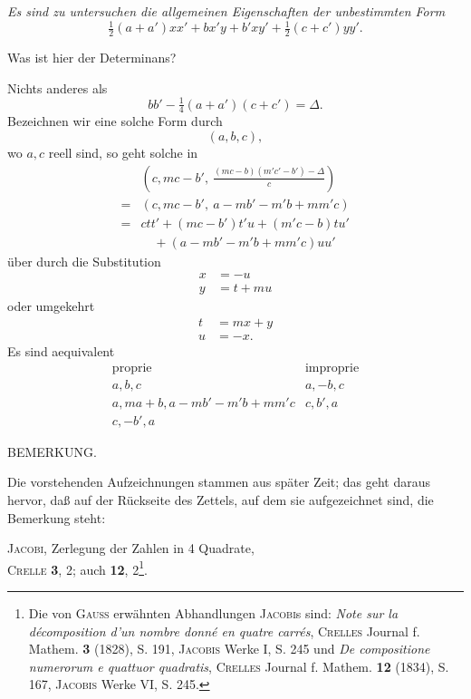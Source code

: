 \textit{Es sind zu untersuchen die allgemeinen Eigenschaften der unbestimmten Form}
\[
\tfrac12(a+a')xx'+bx'y+b'xy'+\tfrac12(c+c')yy'.
\]
\par\noindent\hspace*{\parindent}Was ist hier der Determinans?\par
\noindent\hspace*{\parindent}Nichts anderes als
\[
bb'-\tfrac14(a+a')(c+c')=\Delta.
\]
\noindent Bezeichnen wir eine solche Form durch
\[
(a,b,c),
\]
\noindent wo $a,c$ reell sind, so geht solche in
\[
\begin{aligned}
&\left(c,mc-b',\ \tfrac{(mc-b)(m'c'-b')-\Delta}{c}\right)\\
={}&(c,mc-b',\ a-mb'-m'b+mm'c)\\
={}&ctt'+(mc-b')t'u+(m'c-b)tu'\\
&\quad +(a-mb'-m'b+mm'c)uu'
\end{aligned}
\]
\noindent über durch die Substitution
\[
\begin{aligned}x&=-u\\y&=t+mu\end{aligned}
\]
\noindent oder umgekehrt
\[
\begin{aligned}t&=mx+y\\u&=-x.\end{aligned}
\]
\clearpage
{}
\noindent\hspace*{\parindent}Es sind aequivalent
\[
\begin{array}{c|c}
\text{proprie}&\text{improprie}\\
a,b,c&a,-b,c\\
a,ma+b,a-mb'-m'b+mm'c&c,b',a\\
c,-b',a&
\end{array}
\]
\begin{center}\small BEMERKUNG.\end{center}
\begingroup\small
\noindent\hspace*{\parindent}Die vorstehenden Aufzeichnungen stammen aus später Zeit; das geht daraus hervor, daß auf der
Rückseite des Zettels, auf dem sie aufgezeichnet sind, die Bemerkung steht:
\begin{center}\normalsize
\textsc{Jacobi}, Zerlegung der Zahlen in 4 Quadrate,\\
\textsc{Crelle} \textbf{3}, 2; auch \textbf{12}, 2\footnote{Die von \textsc{Gauss} erwähnten Abhandlungen \textsc{Jacobi}s sind: \textit{Note sur la décomposition d’un nombre
donné en quatre carrés}, \textsc{Crelles} Journal f. Mathem. \textbf{3} (1828), S. 191, \textsc{Jacobis} Werke I, S. 245 und \textit{De
compositione numerorum e quattuor quadratis}, \textsc{Crelles} Journal f. Mathem. \textbf{12} (1834), S. 167, \textsc{Jacobis}
Werke VI, S. 245.}.
\end{center}
